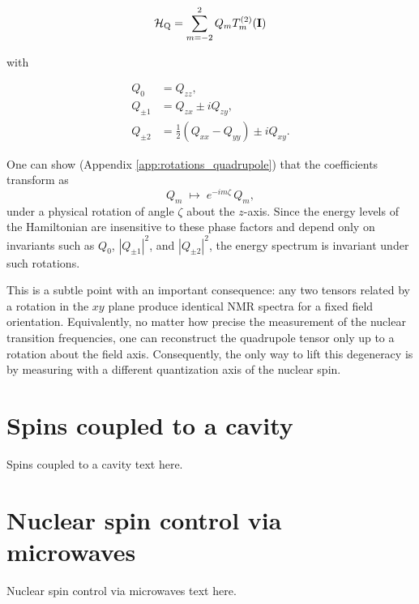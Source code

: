 \begin{equation}
    \mathcal{H}_{\text{Q}} = \sum_{m = -2}^2 Q_m T^{(2)}_m(\mathbf{I})
    \label{eq:quadrupole_spherical}
\end{equation}

\noindent with

\begin{equation}
\begin{aligned}
Q_{0} &= Q_{zz}, \\
Q_{\pm 1} &= Q_{zx} \pm i Q_{zy}, \\
Q_{\pm 2} &= \tfrac{1}{2}(Q_{xx} - Q_{yy}) \pm i Q_{xy}.
\end{aligned}
\end{equation}

One can show (Appendix \ref{app:rotations_quadrupole}) that the coefficients transform as 
\begin{equation}
Q_m \;\mapsto\; e^{-im\zeta}\, Q_m,
\end{equation}
under a physical rotation of angle $\zeta$ about the $z$-axis. Since the energy levels of the Hamiltonian are insensitive to these phase factors and depend only on invariants such as $Q_0$, $|Q_{\pm 1}|^2$, and $|Q_{\pm 2}|^2$, the energy spectrum is invariant under such rotations. 

This is a subtle point with an important consequence: any two tensors related by a rotation in the $xy$ plane produce identical NMR spectra for a fixed field orientation. Equivalently, no matter how precise the measurement of the nuclear transition frequencies, one can reconstruct the quadrupole tensor only up to a rotation about the field axis. Consequently, the only way to lift this degeneracy is by measuring with a different quantization axis of the nuclear spin.



\chapter{Spins coupled to a cavity}

Spins coupled to a cavity text here.


\chapter{Nuclear spin control via microwaves}

Nuclear spin control via microwaves text here.